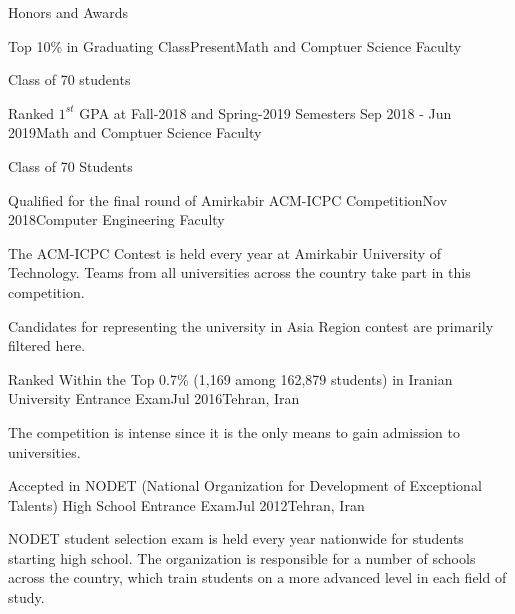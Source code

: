 \documentclass{resume} %
\begin{document}
	\begin{rSection}{Honors and Awards}
		\begin{rSubsection}{Top 10\% in Graduating Class}{Present}{Math and Comptuer Science Faculty}{ }
			\item Class of 70 students
		\end{rSubsection}
		
		\begin{rSubsection}{Ranked $1^{st}$ GPA at Fall-2018 and Spring-2019 Semesters }{Sep 2018 - Jun 2019}{Math and Comptuer Science Faculty}{ }
			\item Class of 70 Students
		\end{rSubsection}	
		
		\begin{rSubsection}{Qualified for the final round of Amirkabir ACM-ICPC Competition}{Nov 2018}{Computer Engineering Faculty}{ }
			\item The ACM-ICPC Contest is held every year at Amirkabir University of Technology. Teams from all universities across the country take part in this competition.
			\item Candidates for representing the university in Asia Region contest are primarily filtered here.
		\end{rSubsection}
		
		\begin{rSubsection}{Ranked Within the Top 0.7\% (1,169 among 162,879 students) in Iranian University Entrance Exam}{Jul 2016}{Tehran, Iran }{ }
			\item The competition is intense since it is the only means to gain admission to universities.
		\end{rSubsection} 
		
		\begin{rSubsection}{Accepted in NODET (National Organization for Development of Exceptional Talents) High School Entrance Exam}{Jul 2012}{Tehran, Iran }{ }
			\item NODET student selection exam is held every year nationwide for students starting high school. The organization is responsible for a number of schools across the country, which train students on a more advanced level in each field of study.
		\end{rSubsection}
		
	\end{rSection}
\end{document}
